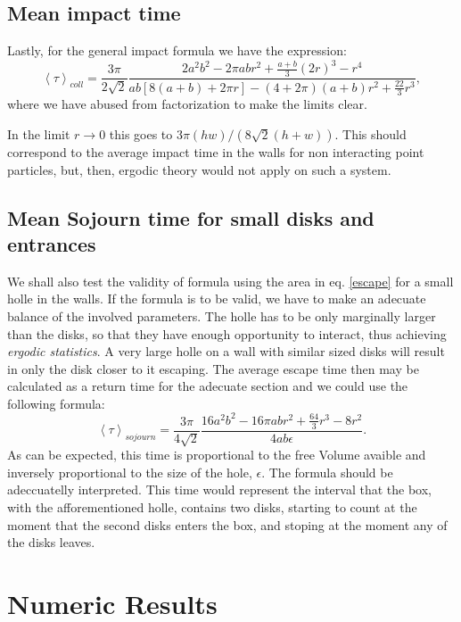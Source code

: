 \documentclass[a4paper,10pt, jcp, aps, preprint]{revtex4-1}
\newcommand{\mean}[1]{\left \langle #1 \right \rangle}
\begin{document}
\subsection{Mean impact time}

Lastly, for the general impact formula we have the expression:
\begin{equation}\label{impactwall}
 \mean{\tau}_{coll} = 	
\frac{3 \pi}{2\sqrt{2}}
\frac { 2a^{2} b^{2}  -  2\pi a b r^{2} + \frac{a+b}{3}(2r)^3 - r^4}
{ab[8(a+b)+2\pi r]- (4+2\pi)(a+b)r^2+\frac{22}{3} r^3},
\end{equation}
where we have abused from factorization to make the limits clear.

In the limit $r\rightarrow 0$ this goes to $3 \pi (hw)/(8\sqrt{2}(h+w))$.
This should correspond to the average impact time in the walls
for non interacting point particles, 
but, then, ergodic theory would not apply
on such a system. 

\subsection{Mean Sojourn  time for small disks and entrances}

We shall also test the validity of formula using the area in eq. \ref{escape}
for a small holle in the walls. If the formula is to be valid, we have
to make an adecuate balance of the involved parameters. The holle has to
be only marginally larger than the disks, so that they have enough opportunity
to interact, thus achieving \emph{ergodic statistics}. A very large holle
on a wall with similar sized disks will result in only the disk closer to
it escaping. The average escape time then may be calculated as
a return time for the adecuate section and we could use the following formula:
\begin{equation} 
\mean{\tau}_{sojourn} = 	
\frac{3 \pi}{4\sqrt{2}}
\frac {16a^2b^2-16\pi a b r^2 + \frac{64}{3} r^3 - 8 r^2  }
{4 a b \epsilon}.
\end{equation}
As can be expected, this time is proportional to the
free Volume avaible and inversely proportional to the size of the hole, $\epsilon$.
The formula should be adeccuatelly interpreted. This time would represent
the interval that the box, with the afforementioned holle, contains two disks,
starting to count at the moment that the second disks enters the box, and
stoping at the moment any of the disks leaves. 


\section{Numeric Results}
\end{document}
